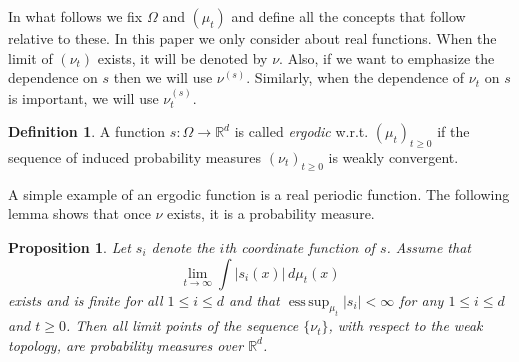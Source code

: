 \documentclass[twoside]{article}
\newcommand{\scom}[1]{s_{#1}}
\newcommand{\real}{\mathbb{R}}
\DeclareMathOperator{\esssup}{ess\,sup}
\newtheorem{prop}[lemma]{Proposition}
\theoremstyle{definition}
\newtheorem{definition}[lemma]{Definition}
\begin{document}
In what follows we fix $\Omega$ and $(\mu_t)$ and define all the concepts that follow relative to these. 
In this paper we only consider about real functions.
When the limit of $(\nu_t)$ exists, it will be denoted by $\nu$.
Also, if we want to emphasize the dependence on $s$ then we will use $\nu^{(s)}$.
Similarly, when the dependence of $\nu_t$ on $s$ is important, we will use $\nu^{(s)}_t$.


\begin{definition}
A function $s:\Omega \rightarrow \real^d$ is called \emph{ergodic} w.r.t. $(\mu_t)_{t\ge0}$
if the sequence of  induced probability measures $(\nu_t)_{t\ge 0}$ is weakly convergent.
\end{definition}
A simple example of an ergodic function is a real periodic function.
The following lemma shows that once $\nu$ exists, it is a probability measure. 
\begin{prop}
\label{lem:ergodicfunction}
Let $\scom{i}$ denote the $i$th coordinate function of $s$. Assume that
\begin{equation}
\label{eq:ergodicproperty}
\lim_{t\to\infty} \int |\scom{i}(x)|\, d\mu_t(x) 
\end{equation}
exists and is finite for all $1 \le i \le d$ and that $\esssup_{\mu_t} |\scom{i}|<\infty$ for any $1\le i \le d$ and $t\ge 0$.
Then all limit points of the sequence $\{\nu_t\}$, with respect to the weak topology, are probability measures over $\real^d$.
\end{prop}
\end{document}
